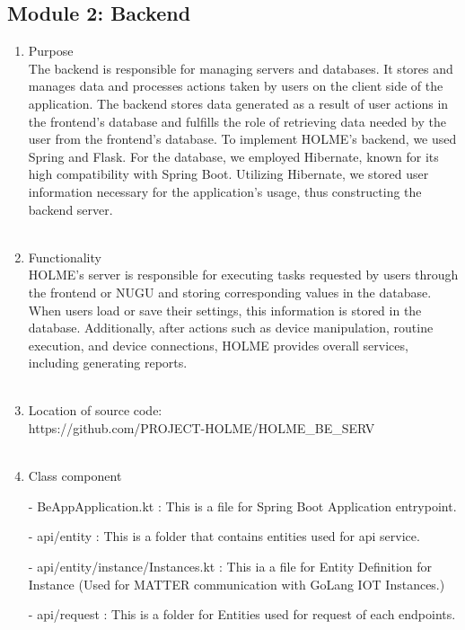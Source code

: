 \documentclass[conference]{IEEEtran}
\begin{document}
\subsection{Module 2: Backend}
\begin{enumerate}
    \item Purpose\\
    The backend is responsible for managing servers and databases. It stores and manages data and processes actions taken by users on the client side of the application. The backend stores data generated as a result of user actions in the frontend's database and fulfills the role of retrieving data needed by the user from the frontend's database. To implement HOLME's backend, we used Spring and Flask. For the database, we employed Hibernate, known for its high compatibility with Spring Boot. Utilizing Hibernate, we stored user information necessary for the application's usage, thus constructing the backend server.\\ \\
    \item Functionality\\
HOLME's server is responsible for executing tasks requested by users through the frontend or NUGU and storing corresponding values in the database. When users load or save their settings, this information is stored in the database. Additionally, after actions such as device manipulation, routine execution, and device connections, HOLME provides overall services, including generating reports.\\\\
    \item Location of source code:\\ https://github.com/PROJECT-HOLME/HOLME\_BE\_SERV \\ \\
    \item Class component
        \item[-] BeAppApplication.kt : This is a file for Spring Boot Application entrypoint.\\
        \item[-] api/entity : This is a folder that contains entities used for api service.\\
        \item[-] api/entity/instance/Instances.kt : This ia a file for Entity Definition for Instance (Used for MATTER communication with
GoLang IOT Instances.)
\\
        \item [-] api/request : This is a folder for Entities used for request of each endpoints.\\

\end{enumerate}
\end{document}
